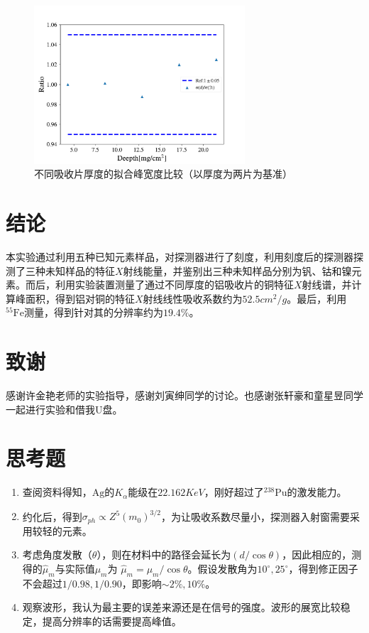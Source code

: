 \documentclass{article}
\begin{document}
    \begin{figure}[htbp]
        \centering
        \includegraphics[width=0.7\textwidth]{../plot/fitted_sigma.pdf}
        \caption{不同吸收片厚度的拟合峰宽度比较（以厚度为两片为基准）\label{fig:fitted_sigma}}
    \end{figure}
    \section{结论}
    本实验通过利用五种已知元素样品，对探测器进行了刻度，利用刻度后的探测器探测了三种未知样品的特征$X$射线能量，并鉴别出三种未知样品分别为钒、钴和镍元素。而后，利用实验装置测量了通过不同厚度的铝吸收片的铜特征$X$射线谱，并计算峰面积，得到铝对铜的特征$X$射线线性吸收系数约为$52.5\si{cm^2\per g}$。最后，利用$^{55}\text{Fe}$测量，得到针对其的分辨率约为$19.4\%$。
    \section{致谢}
    感谢许金艳老师的实验指导，感谢刘寅绅同学的讨论。也感谢张轩豪和童星昱同学一起进行实验和借我U盘。
    \clearpage
    \appendix
    \appendixpage
    \section{思考题}
    \begin{enumerate}
        \item 查阅资料得知，$\text{Ag}$的$K_\alpha$能级在$22.162\si{KeV}$，刚好超过了$^{238}\text{Pu}$的激发能力。
        \item 约化后，得到$\sigma_{ph} \propto Z^5(m_0)^{3/2}$，为让吸收系数尽量小，探测器入射窗需要采用较轻的元素。
        \item 考虑角度发散（$\theta$），则在材料中的路径会延长为$(d/\cos\theta)$，因此相应的，测得的$\hat{\mu}_m$与实际值$\mu_m$为 $\hat{\mu}_m= \mu_m/\cos\theta$。假设发散角为$10^\circ,25^\circ$，得到修正因子不会超过$1/0.98,1/0.90$，即影响$\sim 2\%,10\%$。
        \item 观察波形，我认为最主要的误差来源还是在信号的强度。波形的展宽比较稳定，提高分辨率的话需要提高峰值。
    \end{enumerate}
\end{document}
